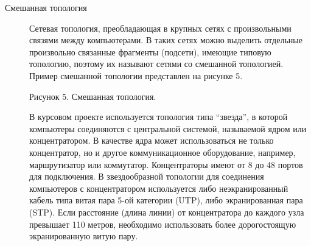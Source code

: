 \begin{description}
\item[Смешанная топология]
  Сетевая топология, преобладающая в крупных сетях с произвольными связями между компьютерами. В таких сетях можно выделить отдельные произвольно связанные фрагменты (подсети), имеющие типовую топологию, поэтому их называют сетями со смешанной топологией. Пример смешанной топологии представлен на рисунке 5.

  Рисунок 5. Смешанная топология.

  В курсовом проекте используется топология типа “звезда”, в которой компьютеры соединяются с центральной системой, называемой ядром или концентратором. В качестве ядра может использоваться не только концентратор, но и другое коммуникационное оборудование, например, маршрутизатор или коммутатор. Концентраторы имеют от 8 до 48 портов для подключения. В звездообразной топологии для соединения компьютеров с концентратором используется либо неэкранированный кабель типа витая пара 5-ой категории (UTP), либо экранированная пара (STP). Если расстояние (длина линии) от концентратора до каждого узла превышает 110 метров, необходимо использовать более дорогостоящую экранированную витую пару.
\end{description}